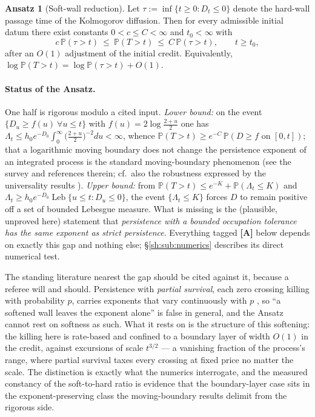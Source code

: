 \documentclass[11pt]{article}
\numberwithin{equation}{section}
\theoremstyle{plain}
\theoremstyle{definition}
\newtheorem{ansatz}[theorem]{Ansatz}
\theoremstyle{remark}
\newcommand{\PP}{\mathbb{P}}
\DeclareMathOperator{\Leb}{Leb}
\begin{document}
\begin{ansatz}[Soft-wall reduction]\label{sh:ansatz}
Let $\tau:=\inf\{t\ge0:D_t\le0\}$ denote the hard-wall passage time of the
Kolmogorov diffusion. Then for every admissible initial datum there exist
constants $0<c\le C<\infty$ and $t_0<\infty$ with
\[
c\,\PP(\tau>t)\ \le\ \PP(T>t)\ \le\ C\,\PP(\tau>t),\qquad t\ge t_0,
\]
after an $O(1)$ adjustment of the initial credit. Equivalently,
$\log\PP(T>t)=\log\PP(\tau>t)+O(1)$.
\end{ansatz}

\paragraph{Status of the Ansatz.}\label{sh:rem:ansatzstatus}
One half is rigorous modulo a cited input. \emph{Lower bound:} on the event
$\{D_u\ge f(u)\ \forall u\le t\}$ with $f(u)=2\log\frac{2+u}{2}$ one has
$\Lambda_t\le h_0e^{-D_0}\int_0^\infty\bigl(\tfrac{2+u}{2}\bigr)^{-2}du<\infty$,
whence $\PP(T>t)\ge e^{-C}\,\PP(D\ge f\text{ on }[0,t])$; that a logarithmic
moving boundary does not change the persistence exponent of an integrated
process is the standard moving-boundary phenomenon (see the survey
\cite{AS15} and references therein; cf.\ also the robustness expressed
by the universality results \cite{AD13,DW15}). \emph{Upper bound:} from
$\PP(T>t)\le e^{-K}+\PP(\Lambda_t\le K)$ and
$\Lambda_t\ge h_0e^{-D_0}\Leb\{u\le t:D_u\le0\}$, the event
$\{\Lambda_t\le K\}$ forces $D$ to remain positive off a set of bounded
Lebesgue measure. What is missing is the (plausible, unproved here)
statement that \emph{persistence with a bounded occupation tolerance has the
same exponent as strict persistence}. Everything tagged \textbf{[A]} below
depends on exactly this gap and nothing else; \S\ref{sh:sub:numerics}
describes its direct numerical test.

The standing literature nearest the gap should be cited against it,
because a referee will and should. Persistence with \emph{partial
survival}, each zero crossing killing with probability $p$, carries exponents that vary continuously with $p$
\cite{MB98, Bur14}, so ``a softened wall leaves the exponent alone''
is false in general, and the Ansatz cannot rest on softness as such.
What it rests on is the structure of this softening: the killing here
is rate-based and confined to a boundary layer of width $O(1)$ in the
credit, against excursions of scale $t^{3/2}$ --- a vanishing fraction
of the process's range, where partial survival taxes every crossing
at fixed price no matter the scale. The distinction is exactly what
the numerics interrogate, and the measured constancy of the
soft-to-hard ratio is evidence that the boundary-layer case sits in
the exponent-preserving class the moving-boundary results
\cite{AS15, DW15} delimit from the rigorous side.
\end{document}
